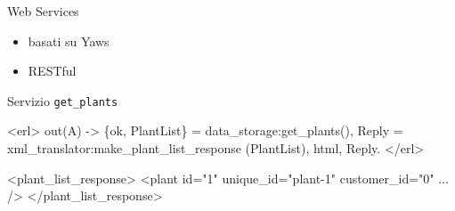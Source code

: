 \documentclass{beamer}
\newcommand{\red}[1]{\textcolor[rgb]{.8,0,0}{#1}}
\newcommand{\blue}[1]{\textcolor[rgb]{0,0,.7}{#1}}
\newcommand{\navy}[1]{\textcolor[rgb]{0,0,.5}{#1}}
\newcommand{\purple}[1]{\textcolor[rgb]{.7,0,.8}{#1}}
\begin{document}
\begin{frame}[fragile]{Web Services}
  \begin{itemize}
  \item basati su \red{Yaws}
  \item \red{RESTful}
  \end{itemize}
%
  \begin{exampleblock}{Servizio \texttt{get\_plants}}
    \begin{semiverbatim}
      \begin{small}
<erl>
out(A) ->
 \{ok, \blue{PlantList}\} = \red{data_storage:get_plants}(),
  Reply =
    \red{xml_translator:make_plant_list_response} (\blue{PlantList}),
  {html, \blue{Reply}}.
</erl>

<\purple{plant_list_response}>
  <\purple{plant} \navy{id}="1" \navy{unique_id}="plant-1" \navy{customer_id}="0" ... />
</\purple{plant_list_response}>
      \end{small}
    \end{semiverbatim}
  \end{exampleblock}
\end{frame}
\end{document}
